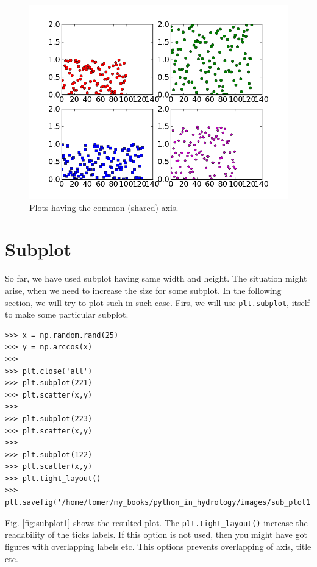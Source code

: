 \documentclass[10pt]{book}
\begin{document}
\beforefig
\begin{figure}[h!]
  \centering
    \includegraphics[scale=0.5]{images/shared_xy.png}
  \caption{Plots having the common (shared) axis.}
   \label{fig:shared_xy}
\end{figure}
\afterfig

\section{Subplot}
So far, we have used subplot having same width and height. The situation might arise, when we need to increase the size for some subplot. In the following section, we will try to plot such in such case. Firs, we will use \verb"plt.subplot", itself to make some particular subplot. 

\beforeverb \begin{verbatim}
>>> x = np.random.rand(25)
>>> y = np.arccos(x)
>>> 
>>> plt.close('all')
>>> plt.subplot(221)
>>> plt.scatter(x,y)
>>> 
>>> plt.subplot(223)
>>> plt.scatter(x,y)
>>> 
>>> plt.subplot(122)
>>> plt.scatter(x,y)
>>> plt.tight_layout()
>>> plt.savefig('/home/tomer/my_books/python_in_hydrology/images/sub_plot1.png')
\end{verbatim} \afterverb
Fig. \ref{fig:subplot1} shows the resulted plot. The \verb"plt.tight_layout()" increase the readability of the ticks labels. If this option is not used, then you might have got figures with overlapping labels etc. This options prevents overlapping of axis, title etc.
\end{document}
